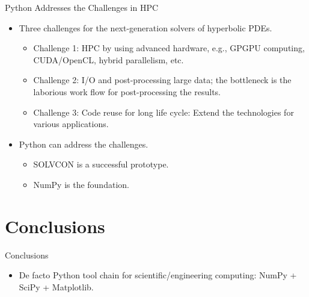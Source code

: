 \documentclass[dvips,xcolor=pst]{beamer}
\begin{document}
\begin{frame}{
%
Python Addresses the Challenges in HPC
%
} \large
\begin{itemize}
  \item Three challenges for the next-generation solvers of hyperbolic PDEs.
  \begin{itemize} \large
    \item \alert{Challenge 1}: HPC by using advanced hardware, e.g., GPGPU
    computing, CUDA/OpenCL, hybrid parallelism, etc.
    \item \alert{Challenge 2}: I/O and post-processing large data; the
    bottleneck is the laborious work flow for post-processing the results.
    \item \alert{Challenge 3}: Code reuse for long life cycle: Extend the
    technologies for various applications.
  \end{itemize}
  \item Python can address the challenges.
  \begin{itemize} \large
    \item SOLVCON is a successful prototype.
    \item NumPy is the foundation.
  \end{itemize}
\end{itemize}
\end{frame}

\section{Conclusions}

\begin{frame}{
%
Conclusions
%
}
\begin{itemize}
  \item De facto Python tool chain for scientific/engineering computing: NumPy
  + SciPy + Matplotlib.
\end{itemize}
\end{frame}
\end{document}
